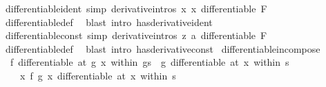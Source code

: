 \begin{isabellebody}
\isanewline
{}\isamarkupfalse%
\ differentiable{\isacharunderscore}{\kern0pt}ident\ {\isacharbrackleft}{\kern0pt}simp{\isacharcomma}{\kern0pt}\ derivative{\isacharunderscore}{\kern0pt}intros{\isacharbrackright}{\kern0pt}{\isacharcolon}{\kern0pt}\ {\isachardoublequoteopen}{\isacharparenleft}{\kern0pt}{\isasymlambda}x{\isachardot}{\kern0pt}\ x{\isacharparenright}{\kern0pt}\ differentiable\ F{\isachardoublequoteclose}\isanewline
%
\isadelimproof
\ \ %
\endisadelimproof
%
\isatagproof
{}\isamarkupfalse%
\ differentiable{\isacharunderscore}{\kern0pt}def\ \isamarkupfalse%
\ {\isacharparenleft}{\kern0pt}blast\ intro{\isacharcolon}{\kern0pt}\ has{\isacharunderscore}{\kern0pt}derivative{\isacharunderscore}{\kern0pt}ident{\isacharparenright}{\kern0pt}%
\endisatagproof
{\isafoldproof}%
%
\isadelimproof
\isanewline
%
\endisadelimproof
\isanewline
{}\isamarkupfalse%
\ differentiable{\isacharunderscore}{\kern0pt}const\ {\isacharbrackleft}{\kern0pt}simp{\isacharcomma}{\kern0pt}\ derivative{\isacharunderscore}{\kern0pt}intros{\isacharbrackright}{\kern0pt}{\isacharcolon}{\kern0pt}\ {\isachardoublequoteopen}{\isacharparenleft}{\kern0pt}{\isasymlambda}z{\isachardot}{\kern0pt}\ a{\isacharparenright}{\kern0pt}\ differentiable\ F{\isachardoublequoteclose}\isanewline
%
\isadelimproof
\ \ %
\endisadelimproof
%
\isatagproof
{}\isamarkupfalse%
\ differentiable{\isacharunderscore}{\kern0pt}def\ \isamarkupfalse%
\ {\isacharparenleft}{\kern0pt}blast\ intro{\isacharcolon}{\kern0pt}\ has{\isacharunderscore}{\kern0pt}derivative{\isacharunderscore}{\kern0pt}const{\isacharparenright}{\kern0pt}%
\endisatagproof
{\isafoldproof}%
%
\isadelimproof
\isanewline
%
\endisadelimproof
\isanewline
{}\isamarkupfalse%
\ differentiable{\isacharunderscore}{\kern0pt}in{\isacharunderscore}{\kern0pt}compose{\isacharcolon}{\kern0pt}\isanewline
\ \ {\isachardoublequoteopen}f\ differentiable\ {\isacharparenleft}{\kern0pt}at\ {\isacharparenleft}{\kern0pt}g\ x{\isacharparenright}{\kern0pt}\ within\ {\isacharparenleft}{\kern0pt}g{\isacharbackquote}{\kern0pt}s{\isacharparenright}{\kern0pt}{\isacharparenright}{\kern0pt}\ {\isasymLongrightarrow}\ g\ differentiable\ {\isacharparenleft}{\kern0pt}at\ x\ within\ s{\isacharparenright}{\kern0pt}\ {\isasymLongrightarrow}\isanewline
\ \ \ \ {\isacharparenleft}{\kern0pt}{\isasymlambda}x{\isachardot}{\kern0pt}\ f\ {\isacharparenleft}{\kern0pt}g\ x{\isacharparenright}{\kern0pt}{\isacharparenright}{\kern0pt}\ differentiable\ {\isacharparenleft}{\kern0pt}at\ x\ within\ s{\isacharparenright}{\kern0pt}{\isachardoublequoteclose}\isanewline

\end{isabellebody}

